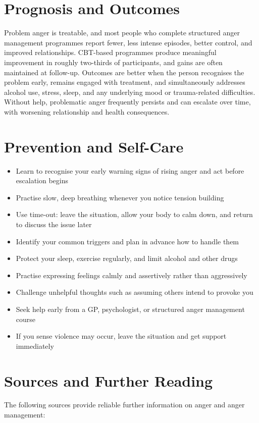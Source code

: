 \section*{Prognosis and Outcomes}
Problem anger is treatable, and most people who complete structured anger management programmes report fewer, less intense episodes, better control, and improved relationships. CBT-based programmes produce meaningful improvement in roughly two-thirds of participants, and gains are often maintained at follow-up. Outcomes are better when the person recognises the problem early, remains engaged with treatment, and simultaneously addresses alcohol use, stress, sleep, and any underlying mood or trauma-related difficulties. Without help, problematic anger frequently persists and can escalate over time, with worsening relationship and health consequences.

\section*{Prevention and Self-Care}
\begin{itemize}
    \item Learn to recognise your early warning signs of rising anger and act before escalation begins
    \item Practise slow, deep breathing whenever you notice tension building
    \item Use time-out: leave the situation, allow your body to calm down, and return to discuss the issue later
    \item Identify your common triggers and plan in advance how to handle them
    \item Protect your sleep, exercise regularly, and limit alcohol and other drugs
    \item Practise expressing feelings calmly and assertively rather than aggressively
    \item Challenge unhelpful thoughts such as assuming others intend to provoke you
    \item Seek help early from a GP, psychologist, or structured anger management course
    \item If you sense violence may occur, leave the situation and get support immediately
\end{itemize}

\section*{Sources and Further Reading}
The following sources provide reliable further information on anger and anger management:

